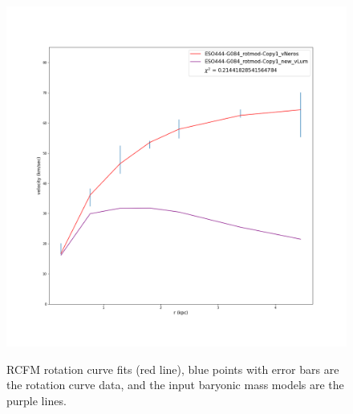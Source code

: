 \documentclass[reprint,%
 amsmath,amssymb,
 aps,
]{revtex4-1}
\begin{document}
\begin{figure}
\begin{minipage}{.5\textwidth}
  \label{fig:test1}
\end{minipage}%
\begin{minipage}{.5\textwidth}
  \centering
  \includegraphics[width=.95\linewidth]{Updated_Graphs_withnewcolorsandfonts/ESO444-G084_rotmod-Copy1_XueSofue.png}
  \label{fig:test1}
\end{minipage}
 \caption{ RCFM rotation curve fits (red line), blue points with error bars are the rotation curve data, and the input baryonic mass models are the purple lines.  }
\end{figure}
\end{document}
